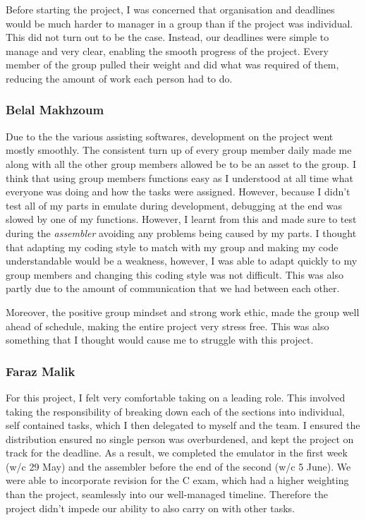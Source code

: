\documentclass[11pt]{article}
\begin{document}
Before starting the project, I was concerned that organisation and deadlines would be much harder to manager in a group than if the project was individual. This did not turn out to be the case. Instead, our deadlines were simple to manage and very clear, enabling the smooth progress of the project. Every member of the group pulled their weight and did what was required of them, reducing the amount of work each person had to do.

\subsubsection*{Belal Makhzoum}
Due to the the various assisting softwares, development on the project went mostly smoothly. The consistent turn up of every group member daily made me along with all the other group members allowed be to be an asset to the group. I think that using group members functions easy as I understood at all time what everyone was doing and how the tasks were assigned. However, because I didn't test all of my parts in emulate during development, debugging at the end was slowed by one of my functions. However, I learnt from this and made sure to test during the {\it assembler} avoiding any problems being caused by my parts. I thought that adapting my coding style to match with my group and making my code understandable would be a weakness, however, I was able to adapt quickly to my group members and changing this coding style was not difficult. This was also partly due to the amount of communication that we had between each other.

Moreover, the positive group mindset and strong work ethic, made the group well ahead of schedule, making the entire project very stress free. This was also something that I thought would cause me to struggle with this project. 

\subsubsection*{Faraz Malik}
For this project, I felt very comfortable taking on a leading role. This involved taking the responsibility of breaking down each of the sections into individual, self contained tasks, which I then delegated to myself and the team. I ensured the distribution ensured no single person was overburdened, and kept the project on track for the deadline. As a result, we completed the emulator in the first week (w/c 29 May) and the assembler before the end of the second (w/c 5 June). 
We were able to incorporate revision for the C exam, which had a higher weighting than the project, seamlessly into our well-managed timeline. Therefore the project didn’t impede our ability to also carry on with other tasks. 
\end{document}
